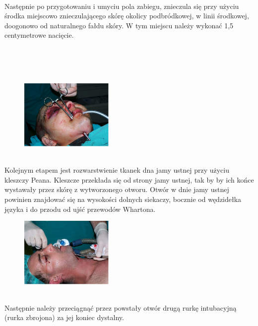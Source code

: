 \documentclass[a4paper, 12pt]{report}
\begin{document}
\hfill\\
Następnie po przygotowaniu i umyciu pola zabiegu, znieczula się przy
użyciu środka miejscowo znieczulającego skórę okolicy podbródkowej, w
linii środkowej, doogonowo od naturalnego fałdu skóry.  W tym miejscu
należy wykonać 1,5 centymetrowe nacięcie.

\newpage
\hfill\\
\hfill\\
\hfill\\

\begin{figure}
\includegraphics[width=0.4\textwidth]{images/itp3}
\end{figure}

\hfill\\
Kolejnym etapem jest rozwarstwienie tkanek dna jamy ustnej przy użyciu
kleszczy Peana. Kleszcze przekłada się od strony jamy ustnej, tak by
by ich końce wystawały przez skórę z wytworzonego otworu. Otwór w
dnie jamy ustnej powinien znajdować się na wysokości dolnych siekaczy,
bocznie od wędzidełka języka i do przodu od ujść przewodów Whartona.
\hfill\\

\begin{figure}
\includegraphics[width=0.4\textwidth]{images/itp3a}
\end{figure}

\hfill\\
Następnie należy przeciągnąć przez powstały otwór drugą rurkę
intubacyjną (rurka zbrojona) za jej koniec dystalny.
\hfill\\
\hfill\\
\hfill\\
\hfill\\
\hfill\\
\hfill\\
\end{document}
